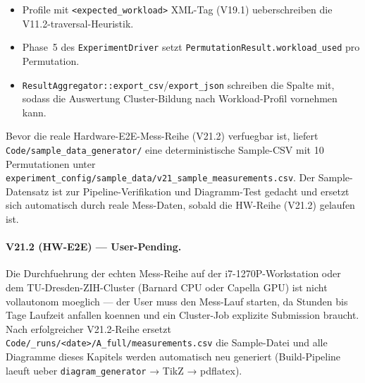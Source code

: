 \begin{itemize}
    \item Profile mit \texttt{<expected\_workload>} XML-Tag
          (V19.1) ueberschreiben die V11.2-traversal-Heuristik.
    \item Phase~5 des \texttt{ExperimentDriver} setzt
          \texttt{PermutationResult.workload\_used} pro Permutation.
    \item \texttt{ResultAggregator::export\_csv}/\texttt{export\_json}
          schreiben die Spalte mit, sodass die Auswertung Cluster-Bildung
          nach Workload-Profil vornehmen kann.
\end{itemize}

Bevor die reale Hardware-E2E-Mess-Reihe (V21.2) verfuegbar ist, liefert
\texttt{Code/sample\_data\_generator/} eine deterministische
Sample-CSV mit 10 Permutationen unter
\texttt{experiment\_config/sample\_data/v21\_sample\_measurements.csv}.
Der Sample-Datensatz ist zur Pipeline-Verifikation und Diagramm-Test
gedacht und ersetzt sich automatisch durch reale Mess-Daten, sobald die
HW-Reihe (V21.2) gelaufen ist.

\paragraph{V21.2 (HW-E2E) — User-Pending.}
Die Durchfuehrung der echten Mess-Reihe auf der i7-1270P-Workstation
oder dem TU-Dresden-ZIH-Cluster (Barnard CPU oder Capella GPU) ist
nicht vollautonom moeglich --- der User muss den Mess-Lauf starten,
da Stunden bis Tage Laufzeit anfallen koennen und ein Cluster-Job
explizite Submission braucht. Nach erfolgreicher V21.2-Reihe ersetzt
\texttt{Code/\_runs/<date>/A\_full/measurements.csv} die Sample-Datei
und alle Diagramme dieses Kapitels werden automatisch neu generiert
(Build-Pipeline laeuft ueber \texttt{diagram\_generator} → TikZ →
pdflatex).
